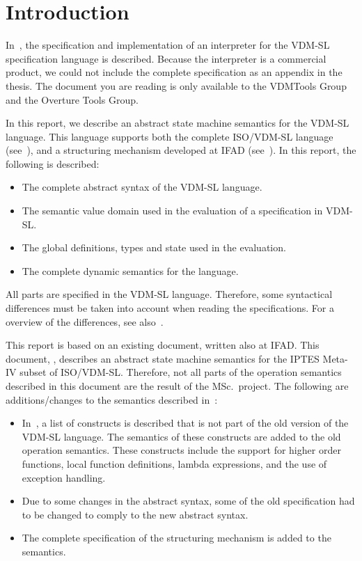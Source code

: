 \chapter{Introduction}
\label{ch:intro}
\raggedbottom

In~\cite{Bruin93a}, the specification and implementation of an interpreter
for the VDM-SL specification language is described. Because the
interpreter is a commercial product, we could not include the complete
specification as an appendix in the thesis. The document you are reading is
only available to the VDMTools Group and the Overture Tools Group.

In this report, we describe an abstract state machine semantics for the
VDM-SL language. This language supports both the complete ISO/VDM-SL
language (see~\cite{BSIVDM92}), and a structuring mechanism developed at
IFAD (see~\cite{Bruin93a}). In this report, the following is described:

\begin{itemize}
\item The complete abstract syntax of the VDM-SL language.
\item The semantic value domain used in the evaluation of a specification
  in VDM-SL.
\item The global definitions, types and state used in the evaluation.
\item The complete dynamic semantics for the language.
\end{itemize}

All parts are specified in the VDM-SL language. Therefore, some
syntactical differences must be taken into account when reading the
specifications. For a overview of the differences, see
also~\cite{Bruin93a}.

This report is based on an existing document, written also at IFAD. This
document, \cite{IPTESIFAD12}, describes an abstract state machine semantics
for the IPTES Meta-IV subset of ISO/VDM-SL. Therefore, not all parts of the
operation semantics described in this document are the result of the
MSc.~project. The following are additions/changes to the semantics
described in~\cite{IPTESIFAD12}:

\begin{itemize}
\item In~\cite{IPTESIFAD137}, a list of constructs is described that is not
  part of the old version of the VDM-SL language. The semantics of
  these constructs are added to the old operation semantics. These
  constructs include the support for higher order functions, local function
  definitions, lambda expressions, and the use of exception handling.

\item Due to some changes in the abstract syntax, some of the old
  specification had to be changed to comply to the new abstract syntax.

\item The complete specification of the structuring mechanism is added to
  the semantics.
\end{itemize}

